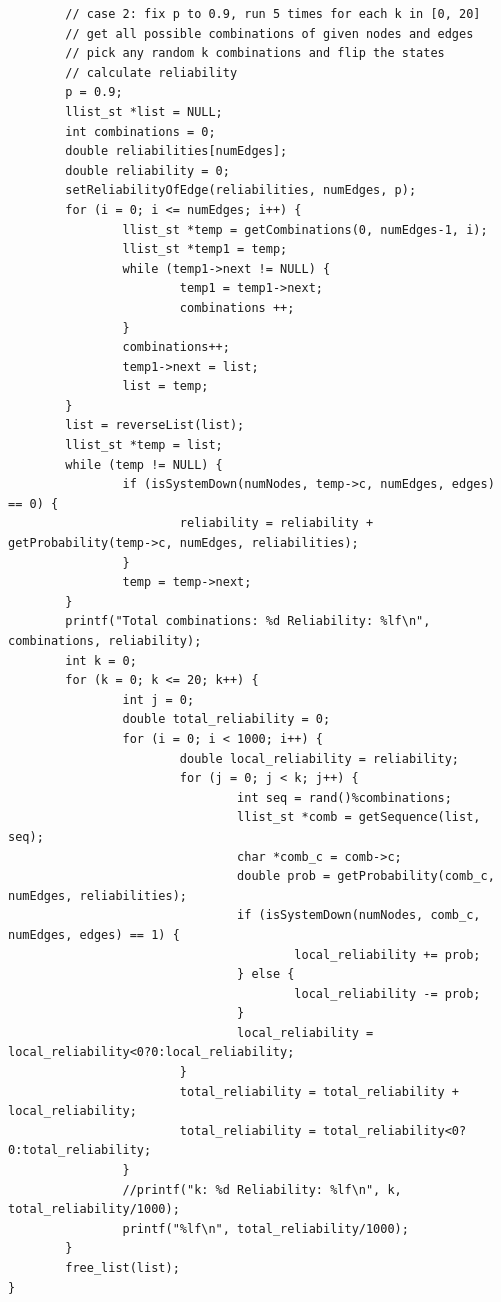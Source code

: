 \documentclass[11pt]{article}
\begin{document}
\begin{lstlisting}
        // case 2: fix p to 0.9, run 5 times for each k in [0, 20]
        // get all possible combinations of given nodes and edges
        // pick any random k combinations and flip the states
        // calculate reliability 
        p = 0.9;
        llist_st *list = NULL;
        int combinations = 0;
        double reliabilities[numEdges];
        double reliability = 0;
        setReliabilityOfEdge(reliabilities, numEdges, p);
        for (i = 0; i <= numEdges; i++) {
                llist_st *temp = getCombinations(0, numEdges-1, i);
                llist_st *temp1 = temp;
                while (temp1->next != NULL) {
                        temp1 = temp1->next;
                        combinations ++;
                }
                combinations++;
                temp1->next = list;
                list = temp;
        }
        list = reverseList(list);
        llist_st *temp = list;
        while (temp != NULL) {
                if (isSystemDown(numNodes, temp->c, numEdges, edges) == 0) {
                        reliability = reliability + getProbability(temp->c, numEdges, reliabilities);
                }
                temp = temp->next;
        }
        printf("Total combinations: %d Reliability: %lf\n", combinations, reliability);
        int k = 0;
        for (k = 0; k <= 20; k++) {
                int j = 0;
                double total_reliability = 0;
                for (i = 0; i < 1000; i++) {
                        double local_reliability = reliability;
                        for (j = 0; j < k; j++) {
                                int seq = rand()%combinations;
                                llist_st *comb = getSequence(list, seq);
                                char *comb_c = comb->c;
                                double prob = getProbability(comb_c, numEdges, reliabilities);
                                if (isSystemDown(numNodes, comb_c, numEdges, edges) == 1) {
                                        local_reliability += prob;
                                } else {
                                        local_reliability -= prob;
                                }
                                local_reliability = local_reliability<0?0:local_reliability;
                        }
                        total_reliability = total_reliability + local_reliability;
                        total_reliability = total_reliability<0?0:total_reliability;
                }
                //printf("k: %d Reliability: %lf\n", k, total_reliability/1000);
                printf("%lf\n", total_reliability/1000);
        }
        free_list(list);
}
\end{lstlisting}
\end{document}

